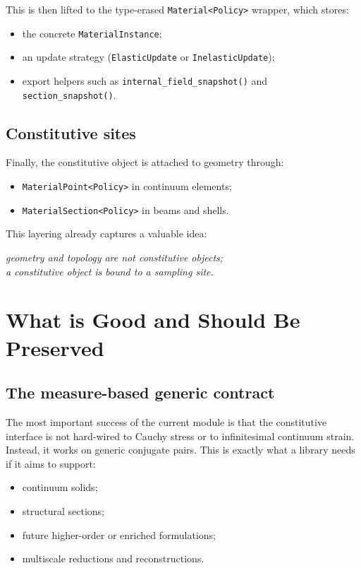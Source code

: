 This is then lifted to the type-erased \texttt{Material<Policy>} wrapper,
which stores:
\begin{itemize}
  \item the concrete \texttt{MaterialInstance};
  \item an update strategy (\texttt{ElasticUpdate} or
        \texttt{InelasticUpdate});
  \item export helpers such as \texttt{internal\_field\_snapshot()} and
        \texttt{section\_snapshot()}.
\end{itemize}

\subsection{Constitutive sites}

Finally, the constitutive object is attached to geometry through:
\begin{itemize}
  \item \texttt{MaterialPoint<Policy>} in continuum elements;
  \item \texttt{MaterialSection<Policy>} in beams and shells.
\end{itemize}

This layering already captures a valuable idea:
\begin{center}
\emph{geometry and topology are not constitutive objects;}\\
\emph{a constitutive object is bound to a sampling site.}
\end{center}

\section{What is Good and Should Be Preserved}

\subsection{The measure-based generic contract}

The most important success of the current module is that the constitutive
interface is not hard-wired to Cauchy stress or to infinitesimal continuum
strain.  Instead, it works on generic conjugate pairs.  This is exactly what a
library needs if it aims to support:
\begin{itemize}
  \item continuum solids;
  \item structural sections;
  \item future higher-order or enriched formulations;
  \item multiscale reductions and reconstructions.
\end{itemize}

